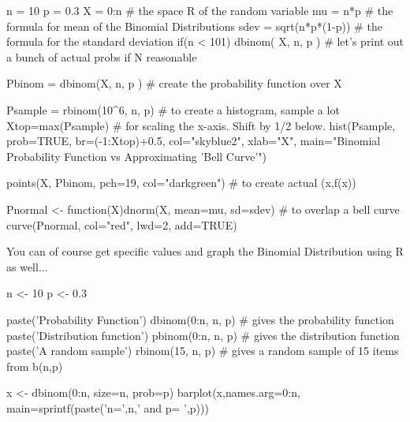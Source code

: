 \documentclass[10pt,]{book}
\numberwithin{equation}{section}
\begin{document}
\begin{sageinput}
n = 10
p = 0.3
X = 0:n    # the space R of the random variable 
mu = n*p      # the formula for mean of the Binomial Distributions
sdev = sqrt(n*p*(1-p))  # the formula for the standard deviation
if(n < 101){
dbinom( X, n, p )   # let's print out a bunch of actual probs if N reasonable
}

Pbinom = dbinom(X, n, p )  # create the probability function over X

Psample = rbinom(10^6, n, p)  # to create a histogram, sample a lot
Xtop=max(Psample)          # for scaling the x-axis. Shift by 1/2 below.
hist(Psample, prob=TRUE, br=(-1:Xtop)+0.5, col="skyblue2", xlab="X", 
  main="Binomial Probability Function vs Approximating 'Bell Curve'")

points(X, Pbinom, pch=19, col="darkgreen")  # to create actual (x,f(x))

Pnormal <- function(X){dnorm(X, mean=mu, sd=sdev)}   # to overlap a bell curve
curve(Pnormal, col="red", lwd=2, add=TRUE)
\end{sageinput}
%
\par
\hypertarget{p-937}{}%
You can of course get specific values and graph the Binomial Distribution using R as well...%
\par
\hypertarget{p-938}{}%
\leavevmode%
\begin{sageinput}
n <- 10
p <- 0.3

paste('Probability Function')
dbinom(0:n, n, p)   # gives the probability function
paste('Distribution function')
pbinom(0:n, n, p)   # gives the distribution function
paste('A random sample')
rbinom(15, n, p)    # gives a random sample of 15 items from b(n,p)

x <- dbinom(0:n, size=n, prob=p)
barplot(x,names.arg=0:n, main=sprintf(paste('n=',n,' and p= ',p)))
\end{sageinput}
%
%
%
\typeout{************************************************}
\typeout{************************************************}
%
\end{document}
